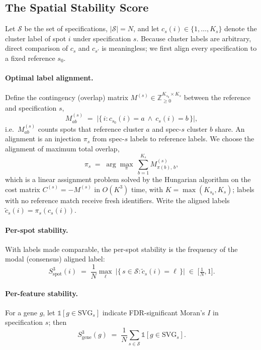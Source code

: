 \subsection{The Spatial Stability Score}
\label{sec:s3}
Let $\mathcal{S}$ be the set of specifications, $|\mathcal{S}| = N$, and let $c_s(i) \in
\{1, \dots, K_s\}$ denote the cluster label of spot $i$ under specification $s$. Because
cluster labels are arbitrary, direct comparison of $c_s$ and $c_{s'}$ is meaningless; we
first align every specification to a fixed reference $s_0$.

\paragraph{Optimal label alignment.} Define the contingency (overlap) matrix
$M^{(s)} \in \mathbb{Z}_{\ge 0}^{K_{s_0} \times K_s}$ between the reference and specification
$s$,
\begin{equation}
  M^{(s)}_{ab} \;=\; \bigl| \{\, i : c_{s_0}(i) = a \ \wedge\ c_s(i) = b \,\} \bigr|,
\end{equation}
i.e.\ $M^{(s)}_{ab}$ counts spots that reference cluster $a$ and spec-$s$ cluster $b$ share.
An alignment is an injection $\pi_s$ from spec-$s$ labels to reference labels. We choose the
alignment of maximum total overlap,
\begin{equation}
  \pi_s \;=\; \arg\max_{\pi}\ \sum_{b=1}^{K_s} M^{(s)}_{\pi(b),\, b},
\end{equation}
which is a linear assignment problem solved by the Hungarian algorithm
\citep{kuhn1955hungarian} on the cost matrix $C^{(s)} = -M^{(s)}$ in $O(K^3)$ time, with
$K = \max(K_{s_0}, K_s)$; labels with no reference match receive fresh identifiers. Write the
aligned labels $\tilde c_s(i) = \pi_s(c_s(i))$.

\paragraph{Per-spot stability.} With labels made comparable, the per-spot stability is the
frequency of the modal (consensus) aligned label:
\begin{equation}
  S^3_{\mathrm{spot}}(i) \;=\; \frac{1}{N} \max_{\ell}\ \bigl| \{\, s \in \mathcal{S} :
  \tilde c_s(i) = \ell \,\} \bigr| \;\in\; \bigl[\tfrac{1}{N}, 1\bigr].
\end{equation}

\paragraph{Per-feature stability.} For a gene $g$, let $\mathbb{1}[g \in \mathrm{SVG}_s]$
indicate FDR-significant Moran's $I$ in specification $s$; then
\begin{equation}
  S^3_{\mathrm{gene}}(g) \;=\; \frac{1}{N} \sum_{s \in \mathcal{S}}
  \mathbb{1}[g \in \mathrm{SVG}_s].
\end{equation}

